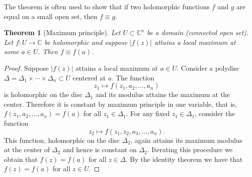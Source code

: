 \documentclass[12pt,openany]{book}
\newcommand{\sabs}[1]{\lvert {#1} \rvert}
\newcommand{\C}{{\mathbb{C}}}
\theoremstyle{plain}
\newtheorem{thm}{Theorem}[section]
\theoremstyle{remark}
\theoremstyle{definition}
\theoremstyle{exercise}
\theoremstyle{example}
\begin{document}
The theorem is often used to show that 
if two holomorphic functions $f$ and $g$ 
are equal on a small open set,
then $f \equiv g$.

\begin{thm}[Maximum principle]
Let $U \subset \C^n$ be a domain (connected open set).
Let $f \colon U \to \C$ be holomorphic and suppose $\sabs{f(z)}$
attains a local maximum at some $a \in U$.  Then $f \equiv f(a)$.
\end{thm}

\begin{proof}
Suppose $\sabs{f(z)}$ attains a local maximum at $a \in U$.  Consider a polydisc
$\Delta = \Delta_1 \times \cdots \times \Delta_n \subset U$
centered at $a$.  The function
\begin{equation*}
z_1 \mapsto f(z_1,a_2,\ldots,a_n) 
\end{equation*}
is holomorphic
on the disc $\Delta_1$ and its modulus attains the maximum
at the center.  Therefore it is constant by maximum principle in one variable,
that is, $f(z_1,a_2,\ldots,a_n)  = f(a)$ for all $z_1 \in \Delta_1$.  For
any fixed $z_1
\in \Delta_1$, consider the function
\begin{equation*}
z_2 \mapsto f(z_1,z_2,a_3,\ldots,a_n)  .
\end{equation*}
This function, holomorphic on the disc $\Delta_2$, again attains its maximum modulus at the center of $\Delta_2$
and hence is constant on $\Delta_2$.  Iterating this procedure we obtain
that $f(z) = f(a)$ for all $z \in \Delta$.  By the identity theorem we have
that $f(z) = f(a)$ for all $z \in U$.
\end{proof}
\end{document}
